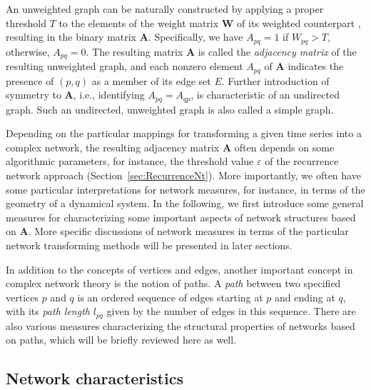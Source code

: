 	An unweighted graph can be naturally constructed by applying a proper threshold $T$ to the elements of the weight matrix $\mathbf{W}$ of its weighted counterpart \cite{Costa2007}, resulting in the binary matrix $\mathbf{A}$. Specifically, we have $A_{pq} = 1$ if $W_{pq} > T$, otherwise, $A_{pq} = 0$. The resulting matrix $\mathbf{A}$ is called the \emph{adjacency matrix} of the resulting unweighted graph, and each nonzero element $A_{pq}$ of $\mathbf{A}$ indicates the presence of $(p,q)$ as a member of its edge set $E$. Further introduction of symmetry to $\mathbf{A}$, i.e., identifying $A_{pq} = A_{qp}$, is characteristic of an undirected graph. Such an undirected, unweighted graph is also called a simple graph.  
	
	Depending on the particular mappings for transforming a given time series into a complex network, the resulting adjacency matrix $\mathbf{A}$ often depends on some algorithmic parameters, for instance, the threshold value $\varepsilon$ of the recurrence network approach (Section~\ref{sec:RecurrenceNt}). More importantly, we often have some particular interpretations for network measures, for instance, in terms of the geometry of a dynamical system. In the following, we first introduce some general measures for characterizing some important aspects of network structures based on $\mathbf{A}$. More specific discussions of network measures in terms of the particular network transforming methods will be presented in later sections. 

	In addition to the concepts of vertices and edges, another important concept in complex network theory is the notion of paths. A \emph{path} between two specified vertices $p$ and $q$ is an ordered sequence of edges starting at $p$ and ending at $q$, with its \emph{path length} $l_{pq}$ given by the number of edges in this sequence. There are also various measures characterizing the structural properties of networks based on paths, which will be briefly reviewed here as well.  

	\subsection{Network characteristics} \label{sec:basictheoryCN}
